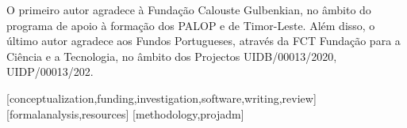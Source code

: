 \documentclass[portuguese]{textolivre}
\begin{document}
O primeiro autor agradece à Fundação Calouste Gulbenkian, no âmbito do
programa de apoio à formação dos PALOP e de Timor-Leste. Além disso, o
último autor agradece aos Fundos Portugueses, através da FCT Fundação
para a Ciência e a Tecnologia, no âmbito dos Projectos UIDB/00013/2020,
UIDP/00013/202.


\printbibliography\label{sec-bib}
\begin{contributors}
[conceptualization,funding,investigation,software,writing,review]
[formalanalysis,resources]
[methodology,projadm]
\end{contributors}
\end{document}
